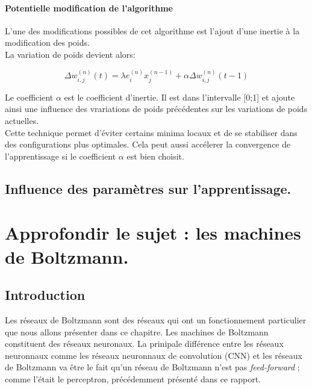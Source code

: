 \documentclass[a4paper,oneside]{report}
\begin{document}
                \subsection{Potentielle modification de l'algorithme}

                    L'une des modifications possibles de cet algorithme est l'ajout d'une inertie à la 
modification des poids.\\

                    La variation de poids devient alors:

                    \begin{equation}
                        \Delta w_{i,j}^{(n)}(t) = \lambda e_{i}^{(n)}x_{j}^{(n-1)} + \alpha \Delta 
w_{i,j}^{(n)}(t-1)
                    \end{equation}

                    Le coefficient $\alpha$ est le coefficient d'inertie. Il est dans l'intervalle 
[0;1] et ajoute ainsi une influence des vrariations de poids précédentes sur les 
variations de poids actuelles.\\

                    Cette technique permet d'éviter certains minima locaux et de se stabiliser dans 
des configurations plus optimales. Cela peut aussi accélerer la convergence de 
l'apprentissage si le coefficient 
$\alpha$ est bien choisit.


        \chapter{Influence des paramètres sur l'apprentissage.}




    \part[Machines de Boltzmann]{Approfondir le sujet : les machines de Boltzmann.}

        \chapter{Introduction}

            Les réseaux de Boltzmann sont des réseaux qui ont un fonctionnement
            particulier que nous allons présenter dans ce chapitre. Les machines de
            Boltzmann constituent des réseaux neuronaux. La prinipale différence entre
            les réseaux neuronnaux comme les réseaux neuronnaux de convolution (CNN) et
            les  réseaux de Boltzmann va être le fait qu'un réseau de Boltzmann n'est
            pas \textit{feed-forward} ; comme l'était le perceptron, précédemment présenté dans ce
            rapport.
\end{document}
